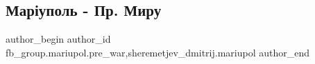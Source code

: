  
 
 
 
 

\subsection{Маріуполь - Пр. Миру}
\label{sec:10_01_2023.fb.fb_group.mariupol.pre_war.1.mar_upol___pr__miru}
 
\ifcmt
 author_begin
   author_id fb_group.mariupol.pre_war,sheremetjev_dmitrij.mariupol
 author_end
\fi
